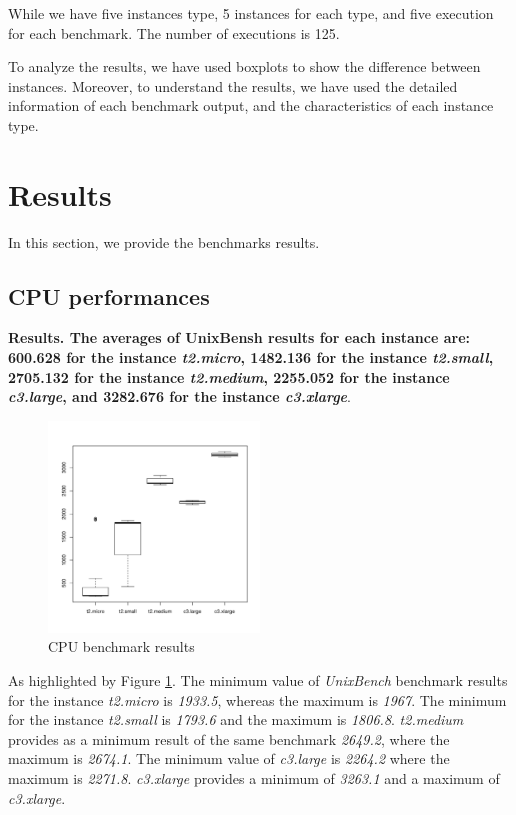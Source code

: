 \documentclass[10pt, conference]{IEEEtran}
\begin{document}
While we have five instances type, 5 instances for each type, and five execution for each benchmark. The number of executions is 125.

To analyze the results, we have used boxplots to show the difference between instances. Moreover, to understand the results, we have used the detailed information of each benchmark output, and the characteristics of each instance type.

\section{Results}
\label{sec:results}

In this section, we provide the benchmarks results.

\subsection{CPU performances}

\textbf{Results. The averages of UnixBensh results for each instance are: 600.628 for the instance \textit{t2.micro}, 1482.136 for the instance \textit{t2.small}, 2705.132 for the instance \textit{t2.medium}, 2255.052 for the instance \textit{c3.large}, and 3282.676 for the instance \textit{c3.xlarge}}.

\begin{figure}
\includegraphics[width=0.5\textwidth]{plots/UnixBench.pdf}
\caption{CPU benchmark results}
\label{fig:UnixBenchResult}
\end{figure}

As highlighted by Figure \ref{fig:UnixBenchResult}. The minimum value of \textit{UnixBench} benchmark results for the instance \textit{t2.micro} is \textit{1933.5}, whereas the maximum is \textit{1967}. The minimum for the instance \textit{t2.small} is \textit{1793.6} and the maximum is \textit{1806.8}. \textit{t2.medium} provides as a minimum result of the same benchmark \textit{2649.2}, where the maximum is \textit{2674.1}. The minimum value of \textit{c3.large} is \textit{2264.2} where the maximum is \textit{2271.8}. \textit{c3.xlarge} provides a minimum of \textit{3263.1} and a maximum of \textit{c3.xlarge}.
\end{document}
